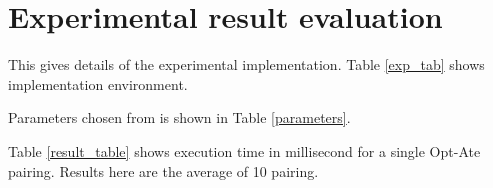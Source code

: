 \section{Experimental result evaluation}
This gives details of the experimental implementation.
Table \ref{exp_tab} shows implementation environment.  
\renewcommand{\baselinestretch}{1.5}
\begin{table}[htb]
\centering
\caption{Computational Environment}
\label{exp_tab}
\end{table}
\renewcommand{\baselinestretch}{1.0}
Parameters chosen from \cite{sylvain_new_param} is shown in Table \ref{parameters}.
\renewcommand{\baselinestretch}{1.5}
\begin{table}[htb]
\caption{Selected parameters for 128-bit security level \cite{sylvain_new_param}}
\label{parameters}
\begin{center}		 
\end{center}
\end{table}
\renewcommand{\baselinestretch}{1.0}
Table \ref{result_table} shows execution time in millisecond for a single Opt-Ate pairing. Results here are the average of 10 pairing.
